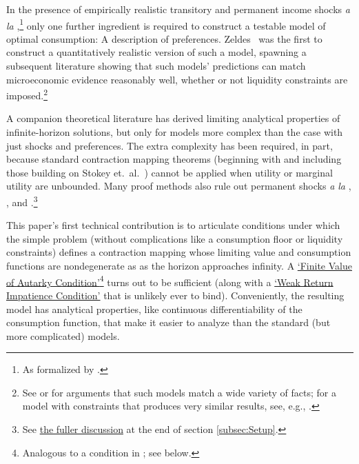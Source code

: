 \documentclass[BufferStockTheory]{subfiles}
\begin{document}
\label{sec:intro}

In the presence of empirically realistic transitory and permanent income shocks \textit{a la} \cite{friedmanATheory},\footnote{As formalized by \cite{muthOptimal}.} only one further ingredient is required to construct a testable model of optimal consumption: A description of preferences.  Zeldes~\citeyearpar{zeldesStochastic} was the first to construct a quantitatively realistic version of such a model, spawning a subsequent literature showing that such models' predictions can match microeconomic evidence reasonably well, whether or not liquidity constraints are imposed.\footnote{See \cite{carrollBSLCPIH} or \cite{gpLifeCycle} for arguments that such models match a wide variety of facts; for a model with constraints that produces very similar results, see, e.g., \cite{Cagetti}.}

A companion theoretical literature has derived limiting analytical properties of infinite-horizon solutions, but only for models more complex than the case with just shocks and preferences.  The extra complexity has been required, in part, because standard contraction mapping theorems (beginning with \cite{bellmanDynamicProgramming} and including those building on Stokey et.~al.~\citeyearpar{slpMethods}) cannot be applied when utility or marginal utility are unbounded.  Many proof methods also rule out permanent shocks \textit{a la} \cite{friedmanATheory}, \cite{muthOptimal}, and \cite{zeldesStochastic}.\footnote{See \hyperlink{DiffFromLit}{the fuller discussion} at the end of section \ref{subsec:Setup}.}

This paper's first technical contribution is to articulate conditions under which the simple problem (without complications like a consumption floor or liquidity constraints) defines a contraction mapping whose limiting value and consumption functions are nondegenerate as as the horizon approaches infinity.  A \hyperlink{FVAC}{`Finite Value of Autarky Condition'}\footnote{Analogous to a condition in \cite{mstIncFluct}; see below.} turns out to be sufficient (along with a \hyperlink{WRIC}{`Weak Return Impatience Condition'} that is unlikely ever to bind).  Conveniently, the resulting model has analytical properties, like continuous differentiability of the consumption function, that make it easier to analyze than the standard (but more complicated) models.  
\end{document}

